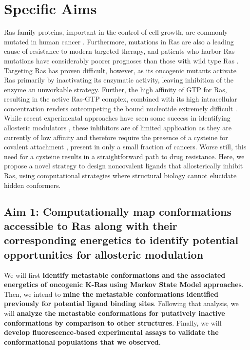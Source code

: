 \documentclass[12pt]{article}
\date{}
\begin{document}
\section*{Specific Aims}
Ras family proteins, important in the control of cell growth, are commonly mutated in human cancer \cite{pyla}. Furthermore, mutations in Ras are also a leading cause of resistance to modern targeted therapy, and patients who harbor Ras mutations have considerably poorer prognoses than those with wild type Ras \cite{mak2014}. Targeting Ras has proven difficult, however, as its oncogenic mutants activate Ras primarily by inactivating its enzymatic activity, leaving inhibition of the enzyme an unworkable strategy. Further, the high affinity of GTP for Ras, resulting in the active Ras-GTP complex, combined with its high intracellular concentration renders outcompeting the bound nucleotide extremely difficult \cite{ostrem2013}. While recent experimental approaches have seen some success in identifying allosteric modulators \cite{ostrem2013}, these inhibitors are of limited application as they are currently of low affinity and therefore require the presence of a cysteine for covalent attachment \cite{ostrem2013}, present in only a small fraction of cancers. Worse still, this need for a cysteine results in a straightforward path to drug resistance. Here, we propose a novel strategy to design noncovalent ligands that allosterically inhibit Ras, using computational strategies where structural biology cannot elucidate hidden conformers.
\subsection*{Aim 1: Computationally map conformations accessible to Ras along with their corresponding energetics to identify potential opportunities for allosteric modulation}
We will first \textbf{identify metastable conformations and the associated energetics of oncogenic K-Ras using Markov State Model approaches}. Then, we intend to \textbf{mine the metastable conformations identified previously for potential ligand binding sites}. Following that analysis, we will \textbf{analyze the metastable conformations for putatively inactive conformations by comparison to other structures}. Finally, we will \textbf{develop fluorescence-based experimental assays to validate the conformational populations that we observed}.
\end{document}

